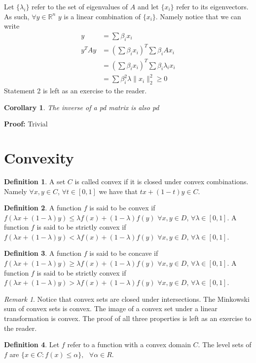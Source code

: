 \documentclass[titlepage]{article}
\theoremstyle{plain}
\newtheorem*{cor}{Corollary}
\theoremstyle{definition}
\newtheorem{defn}{Definition}[section]
\theoremstyle{remark}
\newtheorem*{rem}{Remark}
\begin{document}
Let $\{\lambda_i\}$ refer to the set of eigenvalues of $A$ and let $\{x_i\}$
refer to its eigenvectors. As such, $\forall y \in \mathbb{R}^n$ $y$ is a
linear combination of $\{x_i\}$. Namely notice that we can write
\begin{align*}
y &= \sum \beta_i x_i\\
y^T A y &= (\sum \beta_i x_i)^T \sum \beta_i A x_i\\
&= (\sum \beta_i x_i)^T \sum \beta_i \lambda_i x_i\\
&= \sum \beta_i^2 \lambda \|x_i\|_2^2 \geq 0
\end{align*}
Statement 2 is left as an exercise to the reader.
\begin{cor}
The inverse of a pd matrix is also pd
\end{cor}
\noindent \textbf{Proof: } Trivial
\section{Convexity}
\begin{defn}
A set $C$ is called convex if it is closed under convex combinations. Namely
$\forall x,y \in C$, $\forall t \in [0,1]$ we have that $t x + (1 - t)y \in C$.
\end{defn}
\begin{defn}
A function $f$ is said to be convex if $f(\lambda x + (1 - \lambda)y) \leq
\lambda f(x) + (1 - \lambda)f(y)$ $\forall x,y \in D$, $\forall \lambda \in
[0,1]$.  A function $f$ is said to be strictly convex if $f(\lambda x + (1 -
\lambda)y) < \lambda f(x) + (1 - \lambda)f(y)$ $\forall x,y \in D$, $\forall \lambda \in
[0,1]$.
\end{defn}
\begin{defn}
A function $f$ is said to be concave if $f(\lambda x + (1 - \lambda)y) \geq
\lambda f(x) + (1 - \lambda)f(y)$ $\forall x,y \in D$, $\forall \lambda \in
[0,1]$. A function $f$ is said to be strictly convex if $f(\lambda x + (1 -
\lambda)y) > \lambda f(x) + (1 - \lambda)f(y)$ $\forall x,y \in D$, $\forall \lambda \in
[0,1]$.
\end{defn}
\begin{rem}
Notice that convex sets are closed under intersections. The Minkowski sum of
convex sets is convex. The image of a convex set under a linear transformation
is convex. The proof of all three properties is left as an exercise to the
reader.
\end{rem}
\begin{defn}
Let $f$ refer to a function with a convex domain $C$. The level sets of $f$ are
$\{x  \in C : f(x) \leq \alpha\}, \text{ } \forall \alpha \in R$.
\end{defn}
\end{document}
